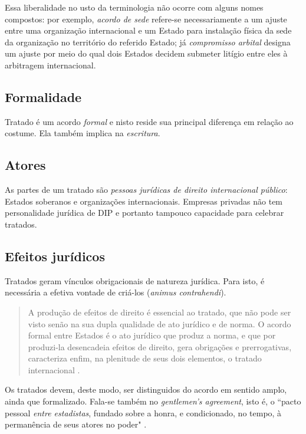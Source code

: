\documentclass{article}
\begin{document}
Essa liberalidade no usto da terminologia não ocorre com alguns nomes compostos: por exemplo, \textit{acordo de sede} refere-se necessariamente a um ajuste entre uma organização internacional e um Estado para instalação física da sede da organização no território do referido Estado; já \textit{compromisso arbital} designa um ajuste por meio do qual dois Estados decidem submeter litígio entre eles à arbitragem internacional.

\subsection{Formalidade}

Tratado é um acordo \textit{formal} e nisto reside sua principal diferença em relação ao costume. Ela também implica na \textit{escritura}.

\subsection{Atores}

As partes de um tratado são \textit{pessoas jurídicas de direito internacional público}: Estados soberanos e organizações internacionais. Empresas privadas não tem personalidade jurídica de DIP e portanto tampouco capacidade para celebrar tratados.

\subsection{Efeitos jurídicos}

Tratados geram vínculos obrigacionais de natureza jurídica. Para isto, é necessária a efetiva vontade de criá-los (\textit{animus contrahendi}).

\begin{quote}
    A produção de efeitos de direito é essen­cial ao tratado, que não pode ser visto senão na sua dupla qualidade de ato jurídico e de norma. O acordo formal entre Estados é o ato jurídico que produz a norma, e que por produzi-la desencadeia efeitos de direito, gera obrigações e prerrogativas, caracteriza enfim, na plenitude de seus dois elementos, o tratado internacional \cite[p.~13]{rezek_direito_2024}.
\end{quote}

Os tratados devem, deste modo, ser distinguidos do acordo em sentido amplo, ainda que formalizado. Fala-se também no \textit{gentlemen's agreement}, isto é, o ``pacto pessoal \textit{entre estadistas}, fundado sobre a honra, e condicionado, no tempo, à permanência de seus atores no poder" \cite[p.~13]{rezek_direito_2024}.
\end{document}
